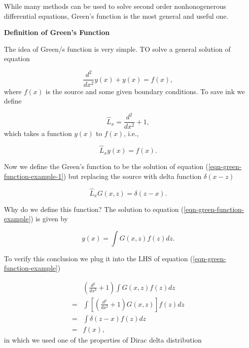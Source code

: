 \documentclass{tufte-handout}
\begin{document}
While many methods can be used to solve second order nonhonogenerous differential equations, Green's function is the most general and useful one.




\begin{framed}

{\bf Definition of Green's Function}
\vspace{1em}

The idea of Green/s function is very simple. TO solve a general solution of equation

\begin{equation*}
    \frac{d^2}{d x^2} y(x) + y(x) = f(x), 
    \label{eqn-green-function-example}
\end{equation*}
where $f(x)$ is the source and some given boundary conditions. To save ink we define 

\begin{equation}
    \hat L_x = \frac{d^2}{dx^2} + 1,
\end{equation}
which takes a function $y(x)$ to $f(x)$, i.e.,

\begin{equation*}
    \hat L_x y(x) = f(x).
    \label{eqn-green-function-example-1}
\end{equation*}

Now we define the Green's function to be the solution of equation (\ref{eqn-green-function-example-1}) but replacing the source with delta function $\delta(x-z)$

\begin{equation*}
    \hat L_x G(x,z) = \delta(z-x).
\end{equation*}

Why do we define this function? The solution to equation (\ref{eqn-green-function-example}) is given by

\begin{equation}
    y(x) = \int G(x,z) f(z) dz.
\end{equation}

To verify this conclusion we plug it into the LHS of equation (\ref{eqn-green-function-example})

\begin{align*}
    & \left(\frac{d^2}{dx^2} +1 \right) \int G(x,z) f(z) dz \\
=& \int \left[ \left(\frac{d^2}{dx^2} +1 \right) G(x,z) \right] f(z) dz \\
=& \int \delta(z-x) f(z) dz \\
=& f(x),
\end{align*}
in which we used one of the properties of Dirac delta distribution


\end{framed}
\end{document}
